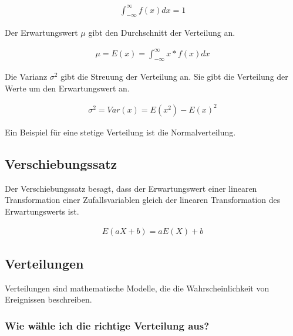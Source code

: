 \documentclass[12pt]{scrartcl}
\begin{document}
\begin{align*}
    \int_{-\infty}^{\infty} f(x) dx = 1
\end{align*}

Der Erwartungswert $\mu$ gibt den Durchschnitt der Verteilung an.\par

\begin{align*}
    \mu = E(x) = \int_{-\infty}^{\infty} x * f(x) dx
\end{align*}

Die Varianz $\sigma^2$ gibt die Streuung der Verteilung an.
Sie gibt die Verteilung der Werte um den Erwartungswert an.
\par

\begin{align*}
    \sigma^2 = Var(x) = E(x^2) - E(x)^2
\end{align*}

Ein Beispiel für eine stetige Verteilung ist die Normalverteilung.

\subsection{Verschiebungssatz}

Der Verschiebungssatz besagt, dass der Erwartungswert einer linearen Transformation einer Zufallsvariablen gleich der linearen Transformation des Erwartungswerts ist.\par

\begin{align*}
    E(aX+b) = aE(X) + b
\end{align*}

\pagebreak

\subsection{Verteilungen}

Verteilungen sind mathematische Modelle, die die Wahrscheinlichkeit von Ereignissen beschreiben.

\subsubsection{Wie wähle ich die richtige Verteilung aus?}
\end{document}
